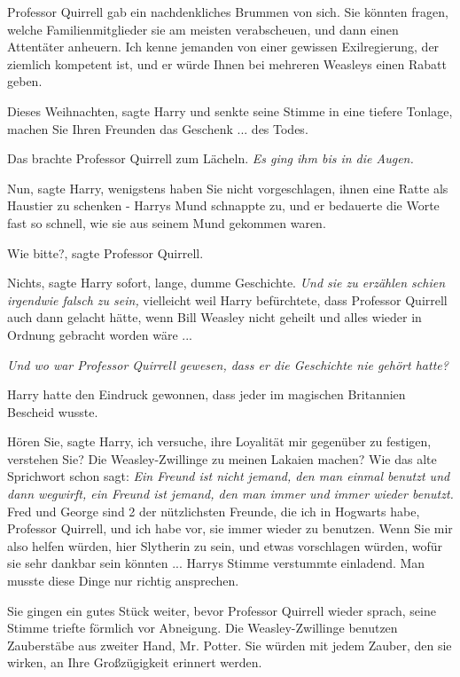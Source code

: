 Professor Quirrell gab ein nachdenkliches Brummen von sich. \glqq{}Sie könnten
fragen, welche Familienmitglieder sie am meisten verabscheuen, und dann einen
Attentäter anheuern. Ich kenne jemanden von einer gewissen Exilregierung, der
ziemlich kompetent ist, und er würde Ihnen bei mehreren Weasleys einen Rabatt
geben.\grqq{}

\glqq{}Dieses Weihnachten\grqq{}, sagte Harry und senkte seine Stimme in eine
tiefere Tonlage, \glqq{}machen Sie Ihren Freunden das Geschenk ... des Todes.\grqq{}

Das brachte Professor Quirrell zum Lächeln.\emph{ Es ging ihm bis in die Augen.}

\glqq{}Nun\grqq{}, sagte Harry, \glqq{}wenigstens haben Sie nicht vorgeschlagen,
ihnen eine Ratte als Haustier zu schenken -\grqq{} Harrys Mund schnappte zu, und er
bedauerte die Worte fast so schnell, wie sie aus seinem Mund gekommen waren.

\glqq{}Wie bitte?\grqq{}, sagte Professor Quirrell.

\glqq{}Nichts\grqq{}, sagte Harry sofort, \glqq{}lange, dumme Geschichte.\grqq{}
\emph{Und sie zu erzählen schien irgendwie falsch zu sein,} vielleicht weil
Harry befürchtete, dass Professor Quirrell auch dann gelacht hätte, wenn Bill
Weasley nicht geheilt und alles wieder in Ordnung gebracht worden wäre ...

\emph{Und wo war Professor Quirrell gewesen, dass er die Geschichte nie gehört
hatte?}

Harry hatte den Eindruck gewonnen, dass jeder im magischen Britannien Bescheid
wusste.

\glqq{}Hören Sie\grqq{}, sagte Harry, \glqq{}ich versuche, ihre Loyalität mir
gegenüber zu festigen, verstehen Sie? Die Weasley-Zwillinge zu meinen Lakaien
machen? Wie das alte Sprichwort schon sagt: \emph{Ein Freund ist nicht jemand,
den man einmal benutzt und dann wegwirft, ein Freund ist jemand, den man immer
und immer wieder benutzt.} Fred und George sind 2 der nützlichsten Freunde, die
ich in Hogwarts habe, Professor Quirrell, und ich habe vor, sie immer wieder zu
benutzen. Wenn Sie mir also helfen würden, hier Slytherin zu sein, und etwas
vorschlagen würden, wofür sie sehr dankbar sein könnten ...\grqq{} Harrys Stimme
verstummte einladend. Man musste diese Dinge nur richtig ansprechen.

Sie gingen ein gutes Stück weiter, bevor Professor Quirrell wieder sprach, seine
Stimme triefte förmlich vor Abneigung. \glqq{}Die Weasley-Zwillinge benutzen
Zauberstäbe aus zweiter Hand, Mr. Potter. Sie würden mit jedem Zauber, den sie
wirken, an Ihre Großzügigkeit erinnert werden.\grqq{}


